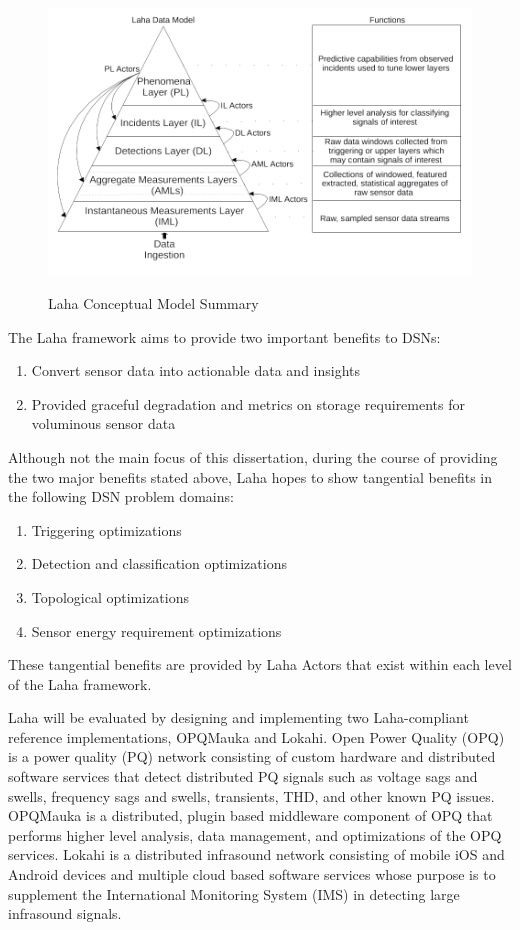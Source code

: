 \begin{figure}
	\caption{Laha Conceptual Model Summary}
	\centering
	\includegraphics{figures/laha_abstract_overview.png}
	\label{laha-abstract-overview}
\end{figure}

The Laha framework aims to provide two important benefits to DSNs:
\begin{enumerate}
	\item Convert sensor data into actionable data and insights
	\item Provided graceful degradation and metrics on storage requirements for voluminous sensor data
\end{enumerate}

Although not the main focus of this dissertation, during the course of providing the two major benefits stated above, Laha hopes to show tangential benefits in the following DSN problem domains:

\begin{enumerate}
	\item Triggering optimizations
	\item Detection and classification optimizations
	\item Topological optimizations
	\item Sensor energy requirement optimizations
\end{enumerate}

These tangential benefits are provided by Laha Actors that exist within each level of the Laha framework. 

Laha will be evaluated by designing and implementing two Laha-compliant reference implementations, OPQMauka and Lokahi. Open Power Quality (OPQ) is a power quality (PQ) network consisting of custom hardware and distributed software services that detect distributed PQ signals such as voltage sags and swells, frequency sags and swells, transients, THD, and other known PQ issues. OPQMauka is a distributed, plugin based middleware component of OPQ that performs higher level analysis, data management, and optimizations of the OPQ services. Lokahi is a distributed infrasound network consisting of mobile iOS and Android devices and multiple cloud based software services whose purpose is to supplement the International Monitoring System (IMS) in detecting large infrasound signals.

